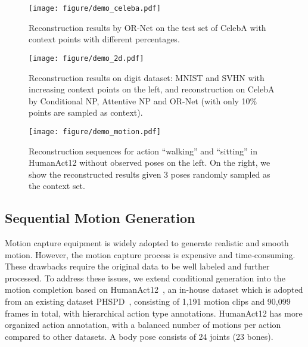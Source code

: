 \documentclass[sigconf]{acmart} %
\begin{document}
\begin{figure}[t]
  \centering
  \texttt{[image: figure/demo\_celeba.pdf]}
  \caption{
    Reconstruction results by OR-Net on the test set of CelebA with context points with different percentages.
  }
  \label{fig:2d_celeba}
\end{figure}


\begin{figure}[t]
  \centering
  \texttt{[image: figure/demo\_2d.pdf]}
  \caption{
    Reconstruction results on digit dataset: MNIST and SVHN with increasing context points on the left, and reconstruction on CelebA by Conditional NP, Attentive NP and OR-Net (with only 10\% points are sampled as context).
  }
  \label{fig:2d_digit}
\end{figure}







\begin{figure*}[t]
  \centering
  \texttt{[image: figure/demo\_motion.pdf]}
  \caption{
    Reconstruction sequences for action ``walking'' and ``sitting'' in HumanAct12 without observed poses on the left. On the right, we show the reconstructed results given 3 poses randomly sampled as the context set.
  }
  \label{fig:3d_demo}
\end{figure*}


\subsection{Sequential Motion Generation} 
Motion capture equipment is widely adopted to generate realistic and smooth motion. However, the motion capture process is expensive and time-consuming. These drawbacks require the original data to be well labeled and further processed. To address these issues, we extend conditional generation into the motion completion based on HumanAct12~\cite{guo2020action2motion}, an in-house dataset which is adopted from an existing dataset PHSPD~\cite{zou2020polarization}, consisting of 1,191 motion clips and 90,099 frames in total, with hierarchical action type annotations. 
HumanAct12 has more organized action annotation, with a balanced number of motions per action compared to other datasets. A body pose consists of 24 joints (23 bones). 
\end{document}
